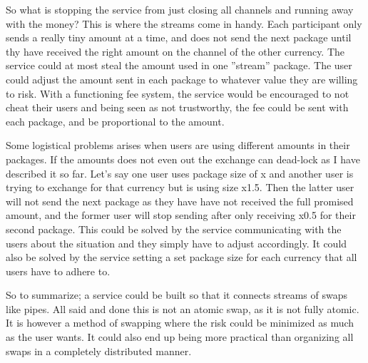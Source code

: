 So what is stopping the service from just closing all channels and running away with the money?
This is where the streams come in handy. Each participant only sends a really tiny amount at
a time, and does not send the next package until thy have received the right amount on the 
channel of the other currency. The service could at most steal the amount used in one 
''stream'' package. The user could adjust the amount sent in each package to 
whatever value they are willing to risk. With a functioning fee system, the service would
be encouraged to not cheat their users and being seen as not trustworthy, the fee could be sent 
with each package, and be proportional to the amount.

Some logistical problems arises when users are using different amounts in their packages. 
If the amounts does not even out the exchange can dead-lock as I have described it so far. 
Let's say one user uses package size of x and another user is trying to exchange for that
currency but is using size x1.5. Then the latter user will not send the next package as 
they have have not received the full promised amount, and the former user will stop sending 
after only receiving x0.5 for their second package. This could be solved by the service 
communicating with the users about the situation and they simply have to adjust accordingly. 
It could also be solved by the service setting a set package size for each currency that
all users have to adhere to. 

So to summarize; a service could be built so that it connects streams of swaps like pipes. 
All said and done this is not an atomic swap, as it is not fully atomic. It is however a 
method of swapping where the risk could be minimized as much as the user wants. It could
also end up being more practical than organizing all swaps in a completely 
distributed manner.